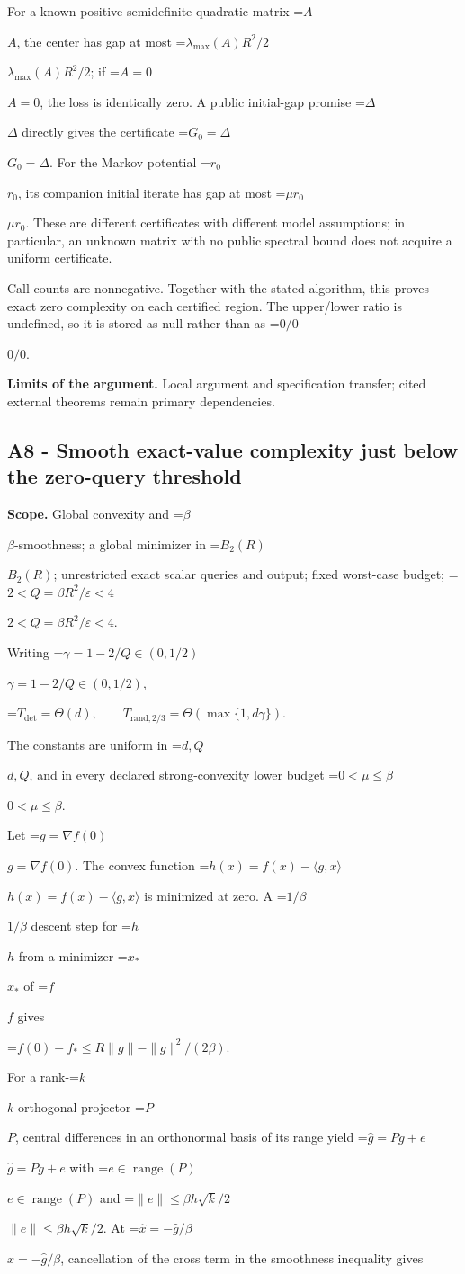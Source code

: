 \documentclass[10pt,a4paper]{article}
\newcommand{\AtlasMath}[1]{\par\begingroup\centering\setbox0=\hbox{$\displaystyle #1$}\ifdim\wd0>1.4\linewidth\typeout{ATLAS WIDE FORMULA: \the\wd0}\fi\ifdim\wd0>\linewidth\resizebox{\linewidth}{!}{\box0}\else\box0\fi\par\endgroup}
\newcommand{\AtlasInlineMath}[1]{\begingroup\setbox0=\hbox{$#1$}\ifdim\wd0>.4\linewidth\endgroup\AtlasMath{#1}\else\endgroup$#1$\fi}
\begin{document}
For a known positive semidefinite quadratic matrix \AtlasInlineMath{A}, the center has gap at most \AtlasInlineMath{\lambda_{\max}(A)R^2/2}; if \AtlasInlineMath{A=0}, the loss is identically zero. A public initial-gap promise \AtlasInlineMath{\Delta} directly gives the certificate \AtlasInlineMath{G_0=\Delta}. For the Markov potential \AtlasInlineMath{r_0}, its companion initial iterate has gap at most \AtlasInlineMath{\mu r_0}. These are different certificates with different model assumptions; in particular, an unknown matrix with no public spectral bound does not acquire a uniform certificate.

Call counts are nonnegative. Together with the stated algorithm, this proves exact zero complexity on each certified region. The upper/lower ratio is undefined, so it is stored as null rather than as \AtlasInlineMath{0/0}.

\textbf{Limits of the argument.} Local argument and specification transfer; cited external theorems remain primary dependencies.

\subsection{A8 - Smooth exact-value complexity just below the zero-query threshold}
\textbf{Scope.} Global convexity and \AtlasInlineMath{\beta}-smoothness; a global minimizer in \AtlasInlineMath{B_2(R)}; unrestricted exact scalar queries and output; fixed worst-case budget; \AtlasInlineMath{2<Q=\beta R^2/\varepsilon<4}.

Writing \AtlasInlineMath{\gamma=1-2/Q\in(0,1/2)},

\AtlasMath{T_{\mathrm{det}}=\Theta(d),\qquad T_{\mathrm{rand},2/3}=\Theta(\max\{1,d\gamma\}).}

The constants are uniform in \AtlasInlineMath{d,Q}, and in every declared strong-convexity lower budget \AtlasInlineMath{0<\mu\le\beta}.

Let \AtlasInlineMath{g=\nabla f(0)}. The convex function \AtlasInlineMath{h(x)=f(x)-\langle g,x\rangle} is minimized at zero. A \AtlasInlineMath{1/\beta} descent step for \AtlasInlineMath{h} from a minimizer \AtlasInlineMath{x_*} of \AtlasInlineMath{f} gives

\AtlasMath{f(0)-f_*\le R\|g\|-\|g\|^2/(2\beta).}

For a rank-\AtlasInlineMath{k} orthogonal projector \AtlasInlineMath{P}, central differences in an orthonormal basis of its range yield \AtlasInlineMath{\widehat g=Pg+e} with \AtlasInlineMath{e\in\operatorname{range}(P)} and \AtlasInlineMath{\|e\|\le\beta h\sqrt{k}/2}. At \AtlasInlineMath{\widehat x=-\widehat g/\beta}, cancellation of the cross term in the smoothness inequality gives
\end{document}
